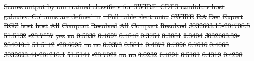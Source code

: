 \documentclass[11pt, a4paper]{book}
\providecommand{\DIFdeltex}[1]{{\protect\color{red}\sout{#1}}}                      %
\providecommand{\DIFdel}[1]{\texorpdfstring{\DIFdeltex{#1}}{}} %
\begin{document}
{%
\DIFdel{Scores output by our trained classifiers for SWIRE~CDFS candidate host galaxies. Columns are defined in }%
\DIFdel{. Full table electronic.}}
\DIFdel{SWIRE }%
\DIFdel{RA }%
\DIFdel{Dec }%
\DIFdel{Expert }%
\DIFdel{RGZ }%
\DIFdel{host }%
\DIFdel{host }%
\DIFdel{All }%
\DIFdel{Compact }%
\DIFdel{Resolved }%
\DIFdel{All }%
\DIFdel{Compact }%
\DIFdel{Resolved}%
\DIFdel{J032603.15-284708.5 }%
\DIFdel{51.5132 }%
\DIFdel{-28.7857 }%
\DIFdel{yes }%
\DIFdel{no }%
\DIFdel{0.5838 }%
\DIFdel{0.4697 }%
\DIFdel{0.4848 }%
\DIFdel{0.3754 }%
\DIFdel{0.3881 }%
\DIFdel{0.3404 }%
\DIFdel{J032603.39-284010.1 }%
\DIFdel{51.5142 }%
\DIFdel{-28.6695 }%
\DIFdel{no }%
\DIFdel{no }%
\DIFdel{0.0373 }%
\DIFdel{0.5814 }%
\DIFdel{0.4878 }%
\DIFdel{0.7896 }%
\DIFdel{0.7616 }%
\DIFdel{0.4668 }%
\DIFdel{J032603.44-284210.1 }%
\DIFdel{51.5144 }%
\DIFdel{-28.7028 }%
\DIFdel{no }%
\DIFdel{no }%
\DIFdel{0.0232 }%
\DIFdel{0.4891 }%
\DIFdel{0.5101 }%
\DIFdel{0.4319 }%
\DIFdel{0.4298 }%
\end{document}

